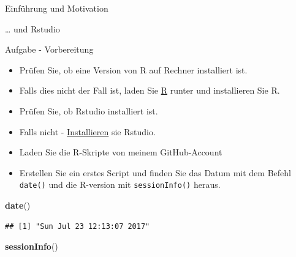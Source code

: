 \documentclass[ignorenonframetext,]{beamer}
\newenvironment{Shaded}{}{}
\newcommand{\KeywordTok}[1]{\textcolor[rgb]{0.00,0.44,0.13}{\textbf{{#1}}}}
\newcommand{\NormalTok}[1]{{#1}}
\providecommand{\tightlist}{%
\setlength{\itemsep}{0pt}\setlength{\parskip}{0pt}}
\begin{document}
\begin{frame}[fragile]{Einführung und Motivation}
\begin{block}{\ldots{} und Rstudio}
\end{block}

\begin{block}{Aufgabe - Vorbereitung}

\begin{itemize}
\tightlist
\item
  Prüfen Sie, ob eine Version von R auf Rechner installiert ist.
\item
  Falls dies nicht der Fall ist, laden Sie \href{r-project.org}{R}
  runter und installieren Sie R.
\item
  Prüfen Sie, ob Rstudio installiert ist.
\item
  Falls nicht - \href{http://www.rstudio.com/}{Installieren} sie
  Rstudio.
\item
  Laden Sie die R-Skripte von meinem GitHub-Account
\item
  Erstellen Sie ein erstes Script und finden Sie das Datum mit dem
  Befehl \texttt{date()} und die R-version mit \texttt{sessionInfo()}
  heraus.
\end{itemize}

\begin{Shaded}
\begin{Highlighting}[]
\KeywordTok{date}\NormalTok{()}
\end{Highlighting}
\end{Shaded}

\begin{verbatim}
## [1] "Sun Jul 23 12:13:07 2017"
\end{verbatim}

\begin{Shaded}
\begin{Highlighting}[]
\KeywordTok{sessionInfo}\NormalTok{()}
\end{Highlighting}
\end{Shaded}


\end{block}
\end{frame}
\end{document}
